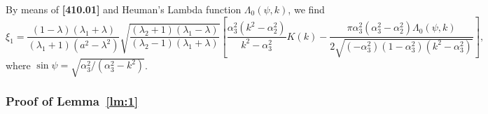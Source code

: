 \documentclass[11pt]{amsart}
\numberwithin{equation}{section}
\numberwithin{figure}{section}
\theoremstyle{plain} %
\theoremstyle{definition} %
\begin{document}
By means of \textbf{[410.01]} and Heuman's Lambda function $\Lambda_0 (\psi,k)$, we find 
\begin{equation}\label{period_trans_2}
\xi_1 
=\frac{(1-\lambda)(\lambda_1+\lambda)}{(\lambda_1+1)(a^2-\lambda^2)}
\sqrt{\frac{(\lambda_2+1)(\lambda_1-\lambda)}{(\lambda_2-1)(\lambda_1+\lambda)}} %
\left[ \frac{\alpha_3^2(k^2-\alpha_2^2)}{k^2-\alpha_3^2} K(k) -\frac{\pi\alpha_3^2(\alpha_3^2-\alpha_2^2)\Lambda_0 (\psi,k)}{2\sqrt{(-\alpha_3^2) (1-\alpha_3^2)(k^2-\alpha_3^2)}}\right],  
\end{equation}
where $\sin\psi = \sqrt{\alpha_3^2/(\alpha_3^2-k^2)}$. 

\subsubsection{Proof of Lemma~\ref{lm:1}} %
\end{document}
